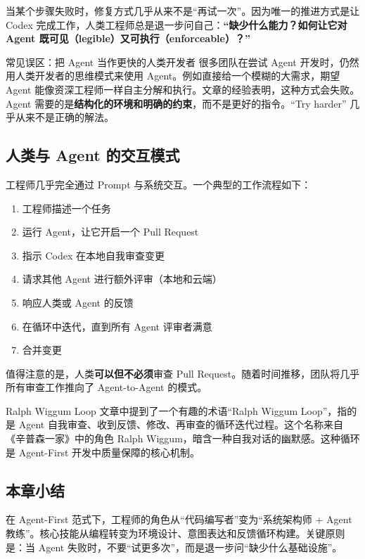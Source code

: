 \documentclass[a4paper]{article}
\begin{document}
当某个步骤失败时，修复方式几乎从来不是``再试一次''。因为唯一的推进方式是让 Codex 完成工作，人类工程师总是退一步问自己：\textbf{``缺少什么能力？如何让它对 Agent 既可见（legible）又可执行（enforceable）？''}

\begin{warningbox}{常见误区：把 Agent 当作更快的人类开发者}
很多团队在尝试 Agent 开发时，仍然用人类开发者的思维模式来使用 Agent。例如直接给一个模糊的大需求，期望 Agent 能像资深工程师一样自主分解和执行。文章的经验表明，这种方式会失败。Agent 需要的是\textbf{结构化的环境和明确的约束}，而不是更好的指令。``Try harder'' 几乎从来不是正确的解法。
\end{warningbox}

\subsection{人类与 Agent 的交互模式}

工程师几乎完全通过 Prompt 与系统交互。一个典型的工作流程如下：

\begin{enumerate}[nosep]
  \item 工程师描述一个任务
  \item 运行 Agent，让它开启一个 Pull Request
  \item 指示 Codex 在本地自我审查变更
  \item 请求其他 Agent 进行额外评审（本地和云端）
  \item 响应人类或 Agent 的反馈
  \item 在循环中迭代，直到所有 Agent 评审者满意
  \item 合并变更
\end{enumerate}

值得注意的是，人类\textbf{可以但不必须}审查 Pull Request。随着时间推移，团队将几乎所有审查工作推向了 Agent-to-Agent 的模式。

\begin{knowledgebox}{Ralph Wiggum Loop}
文章中提到了一个有趣的术语``Ralph Wiggum Loop''，指的是 Agent 自我审查、收到反馈、修改、再审查的循环迭代过程。这个名称来自《辛普森一家》中的角色 Ralph Wiggum，暗含一种自我对话的幽默感。这种循环是 Agent-First 开发中质量保障的核心机制。
\end{knowledgebox}

\subsection{本章小结}

在 Agent-First 范式下，工程师的角色从``代码编写者''变为``系统架构师 + Agent 教练''。核心技能从编程转变为环境设计、意图表达和反馈循环构建。关键原则是：当 Agent 失败时，不要``试更多次''，而是退一步问``缺少什么基础设施''。
\end{document}
